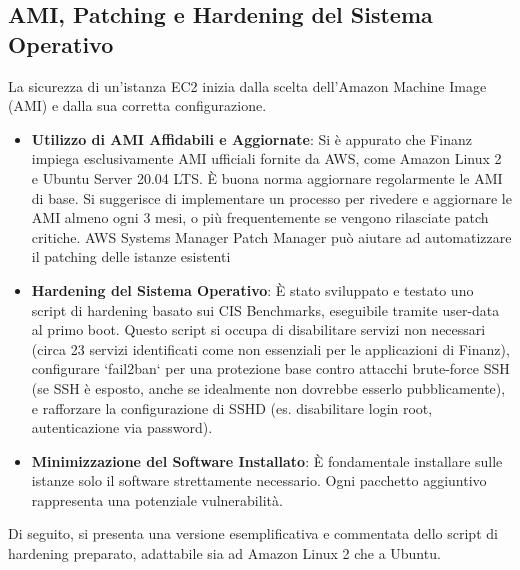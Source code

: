 \subsection{AMI, Patching e Hardening del Sistema Operativo}
\label{subsec:ami-hardening_cap2}
La sicurezza di un'istanza EC2 inizia dalla scelta dell'Amazon Machine Image (AMI) e dalla sua corretta configurazione.
\begin{itemize}
    \item \textbf{Utilizzo di AMI Affidabili e Aggiornate}: Si è appurato che Finanz impiega esclusivamente AMI ufficiali fornite da AWS, come Amazon Linux 2 e Ubuntu Server 20.04 LTS. È buona norma aggiornare regolarmente le AMI di base. Si suggerisce di implementare un processo per rivedere e aggiornare le AMI almeno ogni 3 mesi, o più frequentemente se vengono rilasciate patch critiche. AWS Systems Manager Patch Manager può aiutare ad automatizzare il patching delle istanze esistenti
    \item \textbf{Hardening del Sistema Operativo}: È stato sviluppato e testato uno script di hardening basato sui CIS Benchmarks, eseguibile tramite user-data al primo boot. Questo script si occupa di disabilitare servizi non necessari (circa 23 servizi identificati come non essenziali per le applicazioni di Finanz), configurare `fail2ban` per una protezione base contro attacchi brute-force SSH (se SSH è esposto, anche se idealmente non dovrebbe esserlo pubblicamente), e rafforzare la configurazione di SSHD (es. disabilitare login root, autenticazione via password).
    \item \textbf{Minimizzazione del Software Installato}: È fondamentale installare sulle istanze solo il software strettamente necessario. Ogni pacchetto aggiuntivo rappresenta una potenziale vulnerabilità.
\end{itemize}
Di seguito, si presenta una versione esemplificativa e commentata dello script di hardening preparato, adattabile sia ad Amazon Linux 2 che a Ubuntu.

